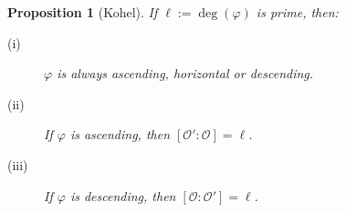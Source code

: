 \documentclass[10pt]{beamer}
\theoremstyle{plain}
\newtheorem{proposition}{Proposition}
\theoremstyle{definition}
\newcommand{\Z}{\mathbb{Z}}
\newcommand{\F}{\mathbb{F}}
\newcommand{\mO}{\mathcal{O}}
\renewcommand{\(}{\left(}
\renewcommand{\)}{\right)}
\DeclareMathOperator{\disc}{disc}
\begin{document}
\begin{frame}
\begin{columns}[t]
\end{columns}

\pause

\begin{proposition}[Kohel]
If $\ell:=\deg(\varphi)$ is prime, then: 
\begin{description}
\item[(i)] $\varphi$ is always ascending, horizontal or descending.
\item[(ii)] If $\varphi$ is ascending, then $[\mO':\mO]=\ell$.
\item[(iii)] If $\varphi$ is descending, then $[\mO:\mO']=\ell$.
\end{description}

\end{proposition}

\end{frame}







\end{document}
